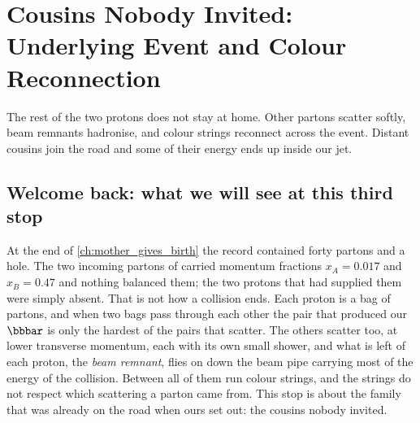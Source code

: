 \providecommand{\ptzero}{\ensuremath{p_{\mathrm{T}0}}\xspace}
\providecommand{\sigint}{\ensuremath{\sigma_{\mathrm{int}}}\xspace}
\providecommand{\signd}{\ensuremath{\sigma_{\mathrm{ND}}}\xspace}
\providecommand{\bmean}{\ensuremath{\langle b\rangle}\xspace}
\chapter{Cousins Nobody Invited: Underlying Event and Colour Reconnection}
\label{ch:uninvited_cousins}

\begin{journeybox}
The rest of the two protons does not stay at home. Other partons scatter softly,
beam remnants hadronise, and colour strings reconnect across the event. Distant
cousins join the road and some of their energy ends up inside our jet.
\end{journeybox}


\section{Welcome back: what we will see at this third stop}
\label{sec:uninvited_cousins:what_we_compute}

At the end of \cref{ch:mother_gives_birth} the record contained forty
partons and a hole. The two incoming partons of  carried
momentum fractions $x_A=0.017$ and $x_B=0.47$ and nothing balanced them;
the two protons that had supplied them were simply absent. That is not how
a collision ends. Each proton is a bag of partons, and when two bags pass
through each other the pair that produced our $\bbbar$ is only the hardest
of the pairs that scatter. The others scatter too, at lower transverse
momentum, each with its own small shower, and what is left of each proton,
the \emph{beam remnant}, flies on down the beam pipe carrying most of the
energy of the collision. Between all of them run colour strings, and the
strings do not respect which scattering a parton came from. This stop is
about the family that was already on the road when ours set out: the
cousins nobody invited.

